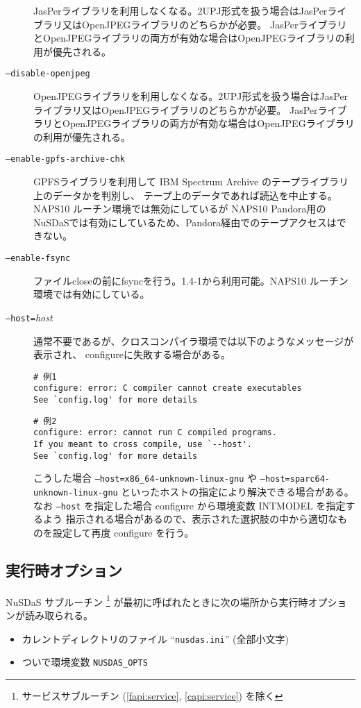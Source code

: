 \begin{description}
JasPerライブラリを利用しなくなる。2UPJ形式を扱う場合はJasPerライブラリ又はOpenJPEGライブラリのどちらかが必要。
JasPerライブラリとOpenJPEGライブラリの両方が有効な場合はOpenJPEGライブラリの利用が優先される。
\item[{\tt --disable-openjpeg}]
OpenJPEGライブラリを利用しなくなる。2UPJ形式を扱う場合はJasPerライブラリ又はOpenJPEGライブラリのどちらかが必要。
JasPerライブラリとOpenJPEGライブラリの両方が有効な場合はOpenJPEGライブラリの利用が優先される。
\item[{\tt --enable-gpfs-archive-chk}]
GPFSライブラリを利用して IBM Spectrum Archive のテープライブラリ上のデータかを判別し、
テープ上のデータであれば読込を中止する。NAPS10 ルーチン環境では無効にしているが
NAPS10 Pandora用のNuSDaSでは有効にしているため、Pandora経由でのテープアクセスはできない。
\item[{\tt --enable-fsync}]
ファイルcloseの前にfsyncを行う。1.4-1から利用可能。NAPS10 ルーチン環境では有効にしている。
\item[{\tt --host=}{\it host}]
通常不要であるが、クロスコンパイラ環境では以下のようなメッセージが表示され、
configureに失敗する場合がある。
\begin{screen}
\begin{verbatim}
# 例1
configure: error: C compiler cannot create executables
See `config.log' for more details
\end{verbatim}
\end{screen}
\begin{screen}
\begin{verbatim}
# 例2
configure: error: cannot run C compiled programs.
If you meant to cross compile, use `--host'.
See `config.log' for more details
\end{verbatim}
\end{screen}
こうした場合 {\tt--host=x86\_64-unknown-linux-gnu} や
{\tt--host=sparc64-unknown-linux-gnu} といったホストの指定により解決できる場合がある。
なお {\tt--host} を指定した場合 configure から環境変数 INTMODEL を指定するよう
指示される場合があるので、表示された選択肢の中から適切なものを設定して再度 configure を行う。
\end{description}

\subsection{実行時オプション}
\label{sec:opts:runtime}

NuSDaS サブルーチン%
\footnote{サービスサブルーチン (\ref{fapi:service}, \ref{capi:service})
を除く}%
が最初に呼ばれたときに次の場所から実行時オプションが読み取られる。
\begin{itemize}
\item{} カレントディレクトリのファイル ``{\tt nusdas.ini}'' (全部小文字)
\item{} ついで環境変数 {\tt NUSDAS\_OPTS}
\end{itemize}

